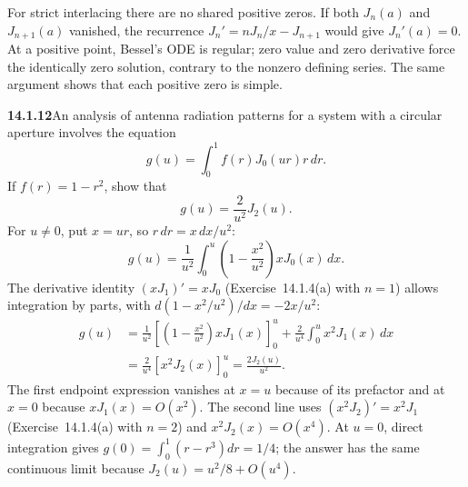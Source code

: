 For strict interlacing there are no shared positive zeros. If both
$J_n(a)$ and $J_{n+1}(a)$ vanished, the recurrence
$J_n'=nJ_n/x-J_{n+1}$ would give $J_n'(a)=0$. At a positive point,
Bessel's ODE is regular; zero value and zero derivative force the
identically zero solution, contrary to the nonzero defining series.
The same argument shows that each positive zero is simple.

\par\bigskip
\noindent\textbf{14.1.12}\quad An analysis of antenna radiation patterns
for a system with a circular aperture involves the equation
\[
g(u)=\int_{0}^{1}f(r)J_{0}(ur)r\,dr.
\]
If $f(r)=1-r^{2}$, show that
\[
g(u)=\frac{2}{u^{2}}J_{2}(u).
\]
\solution
For $u\ne0$, put $x=ur$, so $r\,dr=x\,dx/u^2$:
\[
g(u)=\frac1{u^2}\int_0^u\left(1-\frac{x^2}{u^2}\right)xJ_0(x)\,dx.
\]
The derivative identity $(xJ_1)'=xJ_0$ (Exercise~14.1.4(a) with
$n=1$) allows integration by parts, with
$d(1-x^2/u^2)/dx=-2x/u^2$:
\begin{align*}
g(u)&=\frac1{u^2}
\left[\left(1-\frac{x^2}{u^2}\right)xJ_1(x)\right]_0^u
+\frac2{u^4}\int_0^u x^2J_1(x)\,dx\\
&=\frac2{u^4}\left[x^2J_2(x)\right]_0^u
=\boxed{\frac{2J_2(u)}{u^2}}.
\end{align*}
The first endpoint expression vanishes at $x=u$ because of its
prefactor and at $x=0$ because $xJ_1(x)=O(x^2)$.
The second line uses $(x^2J_2)'=x^2J_1$ (Exercise~14.1.4(a) with
$n=2$) and $x^2J_2(x)=O(x^4)$.
At $u=0$, direct integration gives
$g(0)=\int_0^1(r-r^3)dr=1/4$; the answer has the same continuous
limit because $J_2(u)=u^2/8+O(u^4)$.

